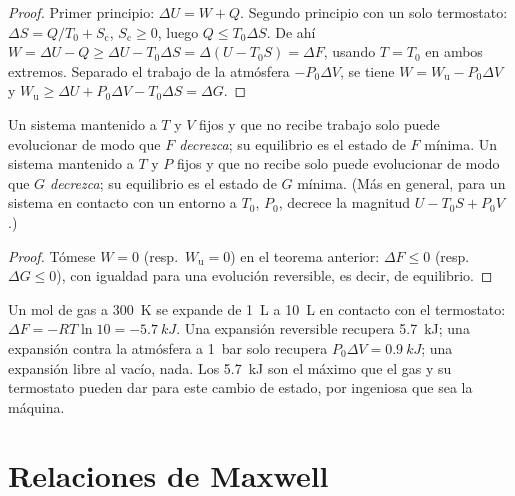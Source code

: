 \begin{proof}
Primer principio: $\Delta U = W + Q$. Segundo principio con un solo termostato: $\Delta S
= Q/T_0 + S_{\text{c}}$, $S_{\text{c}} \ge 0$, luego $Q \le T_0\Delta S$. De ahí
$W = \Delta U - Q \ge \Delta U - T_0\Delta S = \Delta(U - T_0S) = \Delta F$, usando
$T = T_0$ en ambos extremos. Separado el trabajo de la atmósfera $-P_0\Delta V$,
se tiene $W = W_{\text{u}} - P_0\Delta V$ y $W_{\text{u}} \ge \Delta U + P_0
\Delta V - T_0\Delta S = \Delta G$.
\end{proof}

\begin{theorem}\label{thm:b2:thermodynamic-potentials:criteria}
Un sistema mantenido a $T$ y $V$ fijos y que no recibe trabajo solo puede
evolucionar de modo que \emph{$F$ decrezca}; su equilibrio es el estado de
$F$ mínima. Un sistema mantenido a $T$ y $P$ fijos y que no recibe  solo puede evolucionar de modo que \emph{$G$ decrezca}; su equilibrio es
el estado de $G$ mínima. (Más en general, para un sistema en contacto con
un entorno a $T_0$, $P_0$, decrece la magnitud $U - T_0S + P_0V$.)
\end{theorem}

\begin{proof}
Tómese $W = 0$ (resp.\ $W_{\text{u}} = 0$) en el teorema anterior: $\Delta F
\le 0$ (resp.\ $\Delta G \le 0$), con igualdad para una evolución reversible, es decir,
de equilibrio.
\end{proof}

\begin{example}\label{ex:b2:thermodynamic-potentials:expansion}
Un mol de gas a \qty{300}{K} se expande de \qty{1}{L} a \qty{10}{L} en
contacto con el termostato: $\Delta F = -RT\ln 10 = \qty{-5.7}{kJ}$. Una
expansión reversible recupera \qty{5.7}{kJ}; una expansión contra la
atmósfera a \qty{1}{bar} solo recupera $P_0\Delta V = \qty{0.9}{kJ}$; una
expansión libre al vacío, nada. Los \qty{5.7}{kJ} son el máximo que
el gas y su termostato pueden dar para este cambio de estado, por
ingeniosa que sea la máquina.
\end{example}

\section{Relaciones de Maxwell}

